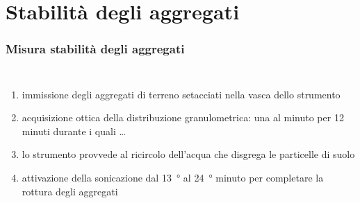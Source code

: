 \documentclass[10pt]{beamer}
\begin{document}
\section{Stabilit\`a degli aggregati}
\begin{frame}
  \frametitle{Misura stabilit\`a degli aggregati}
  \begin{columns}
    \pause
    \begin{enumerate}[<+->] 
    \item immissione degli aggregati di terreno setacciati nella vasca
      dello strumento
    \item acquisizione ottica della distribuzione granulometrica:
      una al minuto per 12 minuti durante i quali \ldots
    \item lo strumento provvede al ricircolo dell'acqua che disgrega
      le particelle di suolo
    \item attivazione della sonicazione dal \SI{13}{\degree} al
      \SI{24}{\degree} minuto per completare la rottura degli
      aggregati
    \end{enumerate}


\end{columns}
\end{frame}
\end{document}
